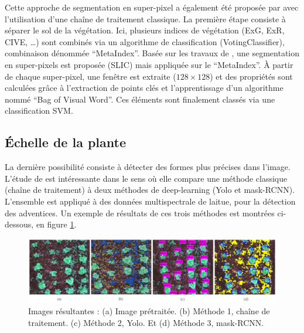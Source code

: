 \documentclass[../thesis.tex]{subfiles}
\begin{document}
    Cette approche de segmentation en super-pixel a également été proposée par \cite{Gee2021} avec l'utilisation d'une chaîne de traitement classique. La première étape consiste à séparer le sol de la végétation. Ici, plusieurs indices de végétation (ExG, ExR, CIVE, \dots) sont combinés via un algorithme de classification (VotingClassifier), combinaison dénommée ``MetaIndex''. Basée sur les travaux de \cite{rs10111690}, une segmentation en super-pixels est proposée (SLIC) mais appliquée sur le ``MetaIndex''. À partir de chaque super-pixel, une fenêtre est extraite ($128 \times 128$) et des propriétés sont calculées grâce à l'extraction de points clés et l'apprentissage d'un algorithme nommé ``Bag of Visual Word''. Ces éléments sont finalement classés via une classification SVM.
    
    \newpage
    \subsection{Échelle de la plante}
    
    La dernière possibilité consiste à détecter des formes plus précises dans l'image. L'étude de \cite{agriengineering2030032} est intéressante dans le sens où elle compare une méthode classique (chaîne de traitement) à deux méthodes de deep-learning (Yolo et mask-RCNN). L'ensemble est appliqué à des données multispectrale de laitue, pour la détection des adventices. Un exemple de résultats de ces trois méthodes est montrées ci-dessous, en figure \ref{fig:agriengineering2030032}.
    
    \begin{figure}[H]
        \centering
        \includegraphics[width=\linewidth]{img/biblio/agriengineering-02-00032-g004-2}
        \caption{Images résultantes : (a) Image prétraitée. (b) Méthode 1, chaîne de traitement. (c) Méthode 2, Yolo. Et (d) Méthode 3, mask-RCNN.}
        \label{fig:agriengineering2030032}
    \end{figure}
    
\end{document}
